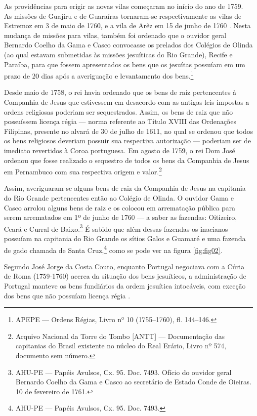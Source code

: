 As providências para erigir as novas vilas começaram no início do ano de 1759. As missões de Guajiru e de Guaraíras tornaram-se respectivamente as vilas de Estremoz em 3 de maio de 1760, e a vila de Arêz em 15 de junho de 1760 \cite[p.~122--123]{Lopes2005}. Nesta mudança de missões para vilas, também foi ordenado que o ouvidor geral Bernardo Coelho da Gama e Casco convocasse os prelados dos Colégios de Olinda (ao qual estavam submetidas às missões jesuíticas do Rio Grande), Recife e Paraíba, para que fossem apresentados os bens que os jesuítas possuíam em um prazo de 20 dias após a averiguação e levantamento dos bens.\footnote{APEPE --- Ordens Régias, Livro nº 10 (1755--1760), fl. 144--146.} 

Desde maio de 1758, o rei havia ordenado que os bens de raiz pertencentes à Companhia de Jesus que estivessem em desacordo com as antigas leis impostas a ordens religiosas poderiam ser sequestrados. Assim, os bens de raiz que não possuíssem licença régia --- norma referente ao Título XVIII das Ordenações Filipinas, presente no alvará de 30 de julho de 1611, no qual se ordenou que todos os bens religiosos deveriam possuir sua respectiva autorização --- poderiam ser de imediato revertidos à Coroa portuguesa. Em agosto de 1759, o rei Dom José ordenou que fosse realizado o sequestro de todos os bens da Companhia de Jesus em Pernambuco com sua respectiva origem e valor.\footnote{Arquivo Nacional da Torre do Tombo [ANTT] --- Documentação das capitanias do Brasil existente no núcleo do Real Erário, Livro nº 574, documento sem número. }

Assim, averiguaram-se alguns bens de raiz da Companhia de Jesus na capitania do Rio Grande pertencentes então ao Colégio de Olinda. O ouvidor Gama e Casco arrolou alguns bens de raiz e os colocou em arrematação pública para serem arrematados em 1º de junho de 1760 --- a saber as fazendas: Oitizeiro, Ceará e Curral de Baixo.\footnote{AHU-PE --- Papéis Avulsos, Cx. 95. Doc. 7493. Ofício do ouvidor geral Bernardo Coelho da Gama e Casco ao secretário de Estado Conde de Oieiras. 10 de fevereiro de 1761.} É sabido que além dessas fazendas os inacianos possuíam na capitania do Rio Grande os sítios Galos e Guamaré e uma fazenda de gado chamada de Santa Cruz,\footnote{AHU-PE --- Papéis Avulsos, Cx. 95. Doc. 7493.} como se pode ver na figura \ref{fig:fig02}.  

Segundo José Jorge da Costa Couto, enquanto Portugal negociava com a Cúria de Roma (1759-1760) acerca da situação dos bens jesuíticos, a administração de Portugal manteve os bens fundiários da ordem jesuítica intocáveis, com exceção dos bens que não possuíam licença régia \cite[p.~149]{Couto1990}.   

